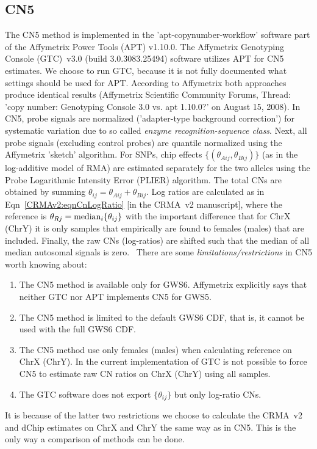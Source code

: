 \documentclass[10pt,a4paper]{article}
\newcommand{\GWSSix}{GWS6\xspace}
\DeclareMathOperator{\median}{\textnormal{median}}
\begin{document}
\subsection{CN5}
The CN5 method is implemented in the 'apt-copynumber-workflow' software part of the Affymetrix Power Tools (APT) v1.10.0.  The Affymetrix Genotyping Console (GTC)~v3.0 (build 3.0.3083.25494) software \citep{Affymetrix_2008m} utilizes APT for CN5 estimates.  We choose to run GTC, because it is not fully documented what settings should be used for APT.  According to Affymetrix both approaches produce identical results (Affymetrix Scientific Community Forums, Thread: 'copy number: Genotyping Console 3.0 vs. apt 1.10.0?' on August 15, 2008).
In CN5, probe signals are normalized ('adapter-type background correction') for systematic variation due to so called \emph{enzyme recognition-sequence class}.   Next, all probe signals (excluding control probes) are quantile normalized using the Affymetrix 'sketch' algorithm.  For SNPs, chip effects $\{(\theta_{Aij}, \theta_{Bij})\}$ (as in the log-additive model of RMA) are estimated separately  for the two alleles using the Probe Logarithmic Intensity Error (PLIER) algorithm.  The total CNs are obtained by summing $\theta_{ij}=\theta_{Aij}+\theta_{Bij}$.
Log ratios are calculated as in Eqn~\eqref{CRMAv2:eqnCnLogRatio} [in the CRMA~v2 manuscript], where the reference is $\theta_{Rj}=\median_i\{\theta_{ij}\}$ with the important difference that for ChrX (ChrY) it is only samples that empirically are found to females (males) that are included.  Finally, the raw CNs (log-ratios) are shifted such that the median of all median autosomal signals is zero.~\citep{Affymetrix_2008m}
There are some \emph{limitations/restrictions} in CN5 worth knowing about:
\begin{enumerate}
\item The CN5 method is available only for \GWSSix.  Affymetrix explicitly says that neither GTC nor APT implements CN5 for GWS5.
\item The CN5 method is limited to the default GWS6 CDF, that is, it cannot be used with the full GWS6 CDF.
\item The CN5 method use only females (males) when calculating reference on ChrX (ChrY).  In the current implementation of GTC is not possible to force CN5 to estimate raw CN ratios on ChrX (ChrY) using all samples.
\item The GTC software does not export $\{\theta_{ij}\}$ but only log-ratio CNs.
\end{enumerate}
It is because of the latter two restrictions we choose to calculate the CRMA~v2 and dChip estimates on ChrX and ChrY the same way as in CN5.  This is the only way a comparison of methods can be done.
\end{document}

